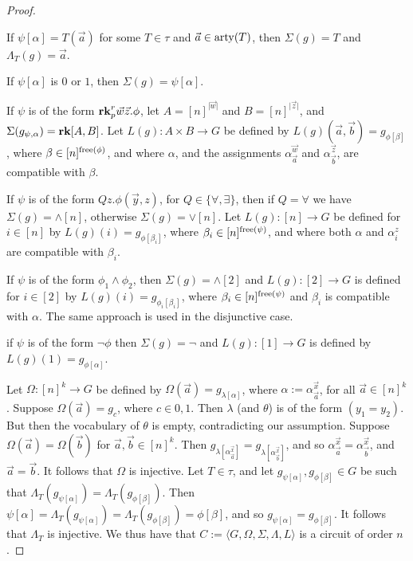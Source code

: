 \documentclass[../paper.tex]{subfiles}
\begin{document}
\begin{proof}
  \begin{itemizens}
  \item If $\psi[\alpha] = T(\vec{a})$ for some $T \in \tau$ and $\vec{a} \in
    \mathrm{arty}(T)$, then $\Sigma (g) = T$ and $\Lambda_T (g) = \vec{a}$.
  \item If $\psi[\alpha]$ is $0$ or $1$, then $\Sigma (g) = \psi[\alpha]$.
  \item If $\psi$ is of the form $\text{\textbf{rk}}^r_p \vec{w} \vec{z}. \phi$, let $A =
    [n]^{\vert \vec{w}\vert}$ and $B = [n]^{\vert \vec{z}\vert}$, and $\Sigma
    (g_{\psi, \alpha}) = \text{\textbf{rk}}[A, B]$. Let $L(g) : A \times B \rightarrow G$ be
    defined by $L(g)(\vec{a},\vec{b}) = g_{\phi[\beta]}$, where $\beta \in
    [n]^{\mathrm{free}(\phi)}$, and where $\alpha$, and the assignments
    $\alpha^{\vec{w}}_{\vec{a}}$ and $\alpha^{\vec{z}}_{\vec{b}}$, are
    compatible with $\beta$.
  \item If $\psi$ is of the form $Q z . \phi(\vec{y}, z)$, for $Q \in \{\forall,
    \exists\}$, then if $Q = \forall$ we have $\Sigma (g) = \land [n]$,
    otherwise $\Sigma (g) = \lor [n]$. Let $L(g) : [n] \rightarrow G$ be defined
    for $i \in [n]$ by $L(g)(i) = g_{\phi[\beta_i]}$, where $\beta_i \in
    [n]^{\mathrm{free}(\psi)}$, and where both $\alpha$ and $\alpha^{z}_{i}$ are
    compatible with $\beta_i$.
  \item If $\psi$ is of the form $\phi_1 \land \phi_2$, then $\Sigma(g) =
    \land[2]$ and $L(g) : [2] \rightarrow G$ is defined for $i \in [2]$ by
    $L(g)(i) = g_{\phi_i[\beta_i]}$, where $\beta_i \in [n]^{\mathrm{free}(\psi)}$ and
    $\beta_i$ is compatible with $\alpha$. The same approach is used in the
    disjunctive case.
  \item if $\psi$ is of the form $\neg \phi$ then $\Sigma (g) = \neg$ and $L(g):
    [1] \rightarrow G$ is defined by $L(g)(1) = g_{\phi[\alpha]}$.
  \end{itemizens}

  Let $\Omega : [n]^k \rightarrow G$ be defined by $\Omega (\vec{a}) =
  g_{\lambda [\alpha]}$, where $\alpha := \alpha^{\vec{x}}_{\vec{a}}$, for all
  $\vec{a} \in [n]^k$. Suppose $\Omega (\vec{a}) = g_c$, where $ c \in {0,1}$.
  Then $\lambda$ (and $\theta$) is of the form $(y_1 = y_2)$. But then the
  vocabulary of $\theta$ is empty, contradicting our assumption. Suppose $\Omega
  (\vec{a}) = \Omega(\vec{b})$ for $\vec{a}, \vec{b} \in [n]^k$. Then
  $g_{\lambda[\alpha^{\vec{x}}_{\vec{a}}]} =
  g_{\lambda[\alpha^{\vec{x}}_{\vec{b}}]}$, and so $\alpha^{\vec{x}}_{\vec{a}} =
  \alpha^{\vec{x}}_{\vec{b}}$, and $\vec{a} = \vec{b}$. It follows that $\Omega$
  is injective. Let $T \in \tau$, and let $g_{\psi[\alpha]}, g_{\phi[\beta]} \in
  G$ be such that $\Lambda_T (g_{\psi[\alpha]}) = \Lambda_T (g_{\phi[\beta]})$.
  Then $\psi[\alpha] = \Lambda_T (g_{\psi[\alpha]}) = \Lambda_T
  (g_{\phi[\beta]}) = \phi[\beta]$, and so $g_{\psi[\alpha]} = g_{\phi[\beta]}$.
  It follows that $\Lambda_T$ is injective. We thus have that $C := \langle G,
  \Omega, \Sigma, \Lambda, L \rangle$ is a circuit of order $n$.


\end{proof}
\end{document}
